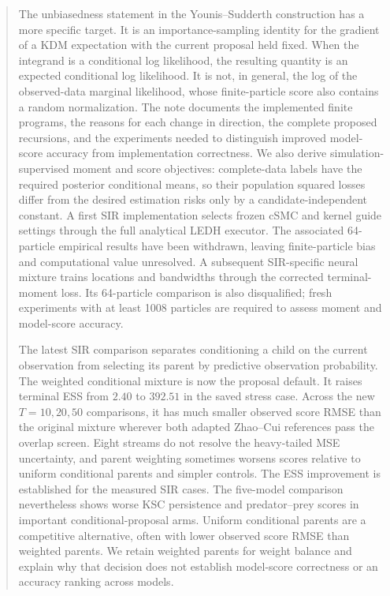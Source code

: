 \documentclass[11pt]{article}
\begin{document}
\begin{abstract}
The unbiasedness statement in the Younis--Sudderth construction has a more
specific target. It is an importance-sampling identity for the gradient of a
KDM expectation with the current proposal held fixed. When the integrand is a
conditional log likelihood, the resulting quantity is an expected conditional
log likelihood. It is not, in general, the log of the observed-data marginal
likelihood, whose finite-particle score also contains a random normalization.
The note documents the implemented finite programs, the reasons for each
change in direction, the complete proposed recursions, and the experiments
needed to distinguish improved model-score accuracy from implementation
correctness. We also derive simulation-supervised moment and score objectives:
complete-data labels have the required posterior conditional means, so their
population squared losses differ from the desired estimation risks only by
a candidate-independent constant. A first SIR implementation selects frozen
cSMC and kernel guide settings through the full analytical LEDH executor.
The associated 64-particle empirical results have been withdrawn, leaving
finite-particle bias and computational value unresolved. A subsequent
SIR-specific neural mixture trains locations and bandwidths through the
corrected terminal-moment loss. Its 64-particle comparison is also disqualified;
fresh experiments with at least 1008 particles are required to assess moment
and model-score accuracy.


The latest SIR comparison separates conditioning a child on the current
observation from selecting its parent by predictive observation probability.
The weighted conditional mixture is now the proposal default. It raises
terminal ESS from $2.40$ to $392.51$ in the saved stress case. Across the new
$T=10,20,50$ comparisons, it has much smaller observed score RMSE than the
original mixture wherever both adapted Zhao--Cui references pass the overlap
screen. Eight streams do not resolve the heavy-tailed MSE uncertainty, and
parent weighting sometimes worsens scores relative to uniform conditional
parents and simpler controls. The ESS improvement is established for the
measured SIR cases. The five-model comparison nevertheless shows worse KSC
persistence and predator--prey scores in important conditional-proposal arms.
Uniform conditional parents are a competitive alternative, often with lower
observed score RMSE than weighted parents. We retain weighted parents for
weight balance and explain why that decision does not establish model-score
correctness or an accuracy ranking across models.
\end{abstract}
\clearpage
\tableofcontents
\clearpage
\end{document}
